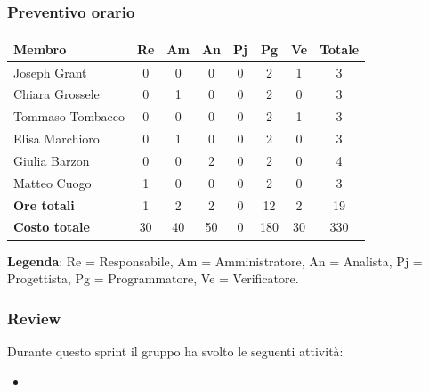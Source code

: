 \documentclass[11pt,a4paper]{article}
\begin{document}
\subsubsection{Preventivo orario}
\begin{center}
    \begin{tabular}{|l|c|c|c|c|c|c|c|}
        \hline
        \textbf{Membro} & \textbf{Re} & \textbf{Am} & \textbf{An} & \textbf{Pj} & \textbf{Pg} & \textbf{Ve} & \textbf{Totale} \\
        \hline
        Joseph Grant & 0 & 0 & 0 & 0 & 2 & 1 & 3 \\
        \hline
        Chiara Grossele & 0 & 1 & 0 & 0 & 2 & 0 & 3 \\
        \hline
        Tommaso Tombacco & 0 & 0 & 0 & 0 & 2 & 1 & 3 \\
        \hline
        Elisa Marchioro & 0 & 1 & 0 & 0 & 2 & 0 & 3 \\
        \hline
        Giulia Barzon & 0 & 0 & 2 & 0 & 2 & 0 & 4 \\
        \hline
        Matteo Cuogo & 1 & 0 & 0 & 0 & 2 & 0 & 3 \\
        \hline
        \textbf{Ore totali} & 1 & 2 & 2 & 0 & 12 & 2 & 19 \\
        \hline
        \textbf{Costo totale} & 30 & 40 & 50 & 0 & 180 & 30 & 330 \\
        \hline
    \end{tabular}
\end{center}

\noindent \textbf{Legenda}: Re = Responsabile, Am = Amministratore, An = Analista, Pj = Progettista, Pg = Programmatore, Ve = Verificatore.

\subsubsection{Review}
Durante questo sprint il gruppo ha svolto le seguenti attività:
\begin{itemize}
    \item
\end{itemize}
\end{document}
